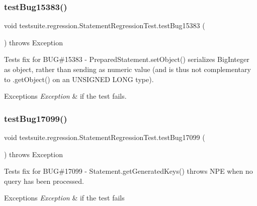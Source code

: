 \subsubsection{\texorpdfstring{test\+Bug15383()}{testBug15383()}}
{\footnotesize\ttfamily void testsuite.\+regression.\+Statement\+Regression\+Test.\+test\+Bug15383 (\begin{DoxyParamCaption}{ }\end{DoxyParamCaption}) throws Exception}

Tests fix for B\+UG\#15383 -\/ Prepared\+Statement.\+set\+Object() serializes Big\+Integer as object, rather than sending as numeric value (and is thus not complementary to .get\+Object() on an U\+N\+S\+I\+G\+N\+ED L\+O\+NG type).


\begin{DoxyExceptions}{Exceptions}
{\em Exception} & if the test fails. \\
\hline
\end{DoxyExceptions}
\mbox{\label{classtestsuite_1_1regression_1_1_statement_regression_test_af66916471e845ecaf25d5a2e0e3b67eb}} 
\subsubsection{\texorpdfstring{test\+Bug17099()}{testBug17099()}}
{\footnotesize\ttfamily void testsuite.\+regression.\+Statement\+Regression\+Test.\+test\+Bug17099 (\begin{DoxyParamCaption}{ }\end{DoxyParamCaption}) throws Exception}

Tests fix for B\+UG\#17099 -\/ Statement.\+get\+Generated\+Keys() throws N\+PE when no query has been processed.


\begin{DoxyExceptions}{Exceptions}
{\em Exception} & if the test fails \\
\hline
\end{DoxyExceptions}
\mbox{\label{classtestsuite_1_1regression_1_1_statement_regression_test_a31f8a70535a902a36164d60c222d0430}} 
